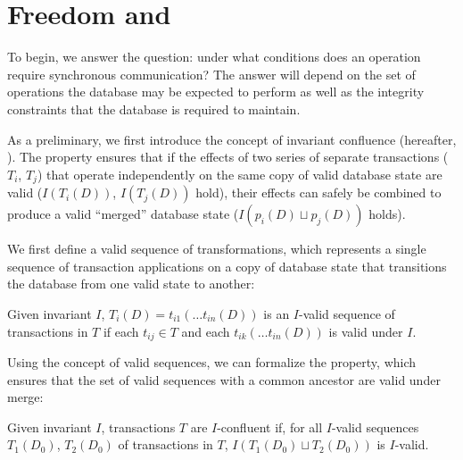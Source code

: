 
\section{Freedom and \iconfluence}
\label{sec:bcc-theory}

To begin, we answer the question: under what conditions does an
operation require synchronous communication? The answer will
depend on the set of operations the database may be expected to
perform as well as the integrity constraints that the database is
required to maintain.

As a preliminary, we first introduce the concept of invariant
confluence (hereafter, \iconfluence). The \iconfluence property
ensures that if the effects of two series of separate transactions
($T_i$, $T_j$) that operate independently on the same copy of valid
database state are valid ($I(T_i(D))$, $I(T_j(D))$ hold), their
effects can safely be combined to produce a valid ``merged'' database
state ($I(p_i(D) \sqcup p_j(D))$ holds).

We first define a valid sequence of transformations, which represents
a single sequence of transaction applications on a copy of database
state that transitions the database from one valid state to another:

\begin{definition}
Given invariant $I$, $T_i(D) = t_{i1}(\dots t_{in}(D))$ is an
$I$-valid sequence of transactions in $T$ if each $t_{ij} \in T$ and
each $t_{ik}(\dots t_{in}(D))$ is valid under $I$.
\end{definition}

Using the concept of valid sequences, we can formalize the
\iconfluence property, which ensures that the set of valid sequences
with a common ancestor are valid under merge:

\begin{definition}[\iconfluence]
Given invariant $I$, transactions $T$ are $I$-confluent if, for all
$I$-valid sequences $T_1(D_0)$, $T_2(D_0)$ of transactions in $T$,
$I(T_1(D_0) \sqcup T_2(D_0))$ is $I$-valid.
\end{definition}


